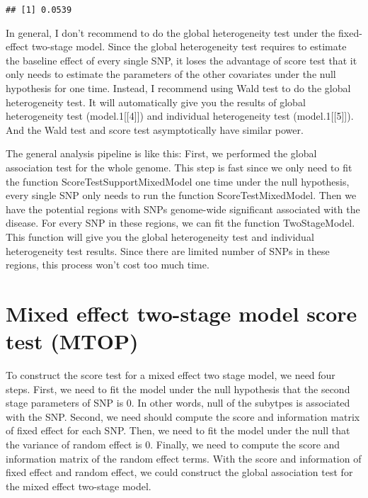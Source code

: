 \documentclass[11pt,]{article}
\begin{document}
\begin{verbatim}
## [1] 0.0539
\end{verbatim}

In general, I don't recommend to do the global heterogeneity test under
the fixed-effect two-stage model. Since the global heterogeneity test
requires to estimate the baseline effect of every single SNP, it loses
the advantage of score test that it only needs to estimate the
parameters of the other covariates under the null hypothesis for one
time. Instead, I recommend using Wald test to do the global
heterogeneity test. It will automatically give you the results of global
heterogeneity test (model.1{[}{[}4{]}{]}) and individual heterogeneity
test (model.1{[}{[}5{]}{]}). And the Wald test and score test
asymptotically have similar power.

The general analysis pipeline is like this: First, we performed the
global association test for the whole genome. This step is fast since we
only need to fit the function ScoreTestSupportMixedModel one time under
the null hypothesis, every single SNP only needs to run the function
ScoreTestMixedModel. Then we have the potential regions with SNPs
genome-wide significant associated with the disease. For every SNP in
these regions, we can fit the function TwoStageModel. This function will
give you the global heterogeneity test and individual heterogeneity test
results. Since there are limited number of SNPs in these regions, this
process won't cost too much time.

\section{Mixed effect two-stage model score test
(MTOP)}\label{mixed-effect-two-stage-model-score-test-mtop}

To construct the score test for a mixed effect two stage model, we need
four steps. First, we need to fit the model under the null hypothesis
that the second stage parameters of SNP is 0. In other words, null of
the subytpes is associated with the SNP. Second, we need should compute
the score and information matrix of fixed effect for each SNP. Then, we
need to fit the model under the null that the variance of random effect
is 0. Finally, we need to compute the score and information matrix of
the random effect terms. With the score and information of fixed effect
and random effect, we could construct the global association test for
the mixed effect two-stage model.
\end{document}
